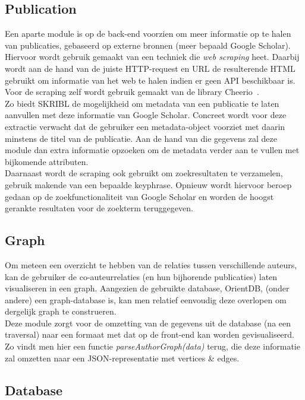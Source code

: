\documentclass{article}
\begin{document}
\subsection{Publication}

Een aparte module is op de back-end voorzien om meer informatie op te halen van publicaties, gebaseerd op externe bronnen (meer bepaald Google Scholar). Hiervoor wordt gebruik gemaakt van een techniek die \textit{web scraping} heet. Daarbij wordt aan de hand van de juiste HTTP-request en URL de resulterende HTML gebruikt om informatie van het web te halen indien er geen API beschikbaar is. Voor de scraping zelf wordt gebruik gemaakt van de library Cheerio~\cite{website:cheerio}. \\

Zo biedt SKRIBL de mogelijkheid om metadata van een publicatie te laten aanvullen met deze informatie van Google Scholar. Concreet wordt voor deze extractie verwacht dat de gebruiker een metadata-object voorziet met daarin minstens de titel van de publicatie. Aan de hand van die gegevens zal deze module dan extra informatie opzoeken om de metadata verder aan te vullen met bijkomende attributen. \\

Daarnaast wordt de scraping ook gebruikt om zoekresultaten te verzamelen, gebruik makende van een bepaalde keyphrase. Opnieuw wordt hiervoor beroep gedaan op de zoekfunctionaliteit van Google Scholar en worden de hoogst gerankte resultaten voor de zoekterm teruggegeven.

\subsection{Graph}

Om meteen een overzicht te hebben van de relaties tussen verschillende auteurs, kan de gebruiker de co-auteurrelaties (en hun bijhorende publicaties) laten visualiseren in een graph. Aangezien de gebruikte database, OrientDB, (onder andere) een graph-database is, kan men relatief eenvoudig deze overlopen om dergelijk graph te construeren. \\

Deze module zorgt voor de omzetting van de gegevens uit de database (na een traversal) naar een formaat met dat op de front-end kan worden gevisualiseerd. Zo vindt men hier een functie \textit{parseAuthorGraph(data)} terug, die deze informatie zal omzetten naar een JSON-representatie met vertices \& edges.

\subsection{Database}
\end{document}
